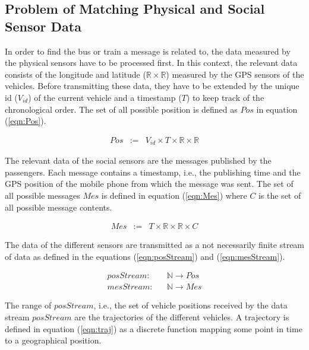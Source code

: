 \subsection{Problem of Matching Physical and Social Sensor Data}\label{sec:problem}

In order to find the bus or train a message is related to, the data measured by the physical sensors have to be processed first. In this context, the relevant data consists of the longitude and latitude ($\mathbb{R} \times \mathbb{R}$) measured by the GPS sensors of the vehicles. Before transmitting these data, they have to be extended by the unique id ($V_{id}$) of the current vehicle and a timestamp ($T$) to keep track of the chronological order. The set of all possible position is defined as $Pos$ in equation (\ref{eqn:Pos}).

\vspace*{-2\baselineskip}
\begin{eqnarray}
 Pos & := & V_{id} \times T \times \mathbb{R} \times \mathbb{R}\label{eqn:Pos}
\end{eqnarray}

The relevant data of the social sensors are the messages published by the passengers. Each message contains a timestamp, i.e., the publishing time and the GPS position of the mobile phone from which the message was sent. The set of all possible messages $Mes$ is defined in equation (\ref{eqn:Mes}) where $C$ is the set of all possible message contents.

\vspace*{-2\baselineskip}
\begin{eqnarray}
 Mes & := & T \times \mathbb{R} \times \mathbb{R} \times C\label{eqn:Mes}
\end{eqnarray}

The data of the different sensors are transmitted as a not necessarily finite stream of data as defined in the equations (\ref{eqn:posStream}) and (\ref{eqn:mesStream}).

\vspace*{-2\baselineskip}
\begin{eqnarray}
 posStream: &  & \mathbb{N} \rightarrow Pos\label{eqn:posStream}\\
 mesStream: &  & \mathbb{N} \rightarrow Mes\label{eqn:mesStream}
\end{eqnarray}

The range of $posStream$, i.e., the set of vehicle positions received by the data stream $posStream$ are the trajectories of the different vehicles. A trajectory is defined in equation (\ref{eqn:traj}) as a discrete function mapping some point in time to a geographical position.

